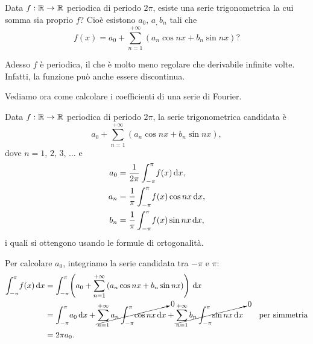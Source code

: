 \documentclass[../../analisi2]{subfiles}
\begin{document}
        Data \(f : \mathbb{R} \to \mathbb{R}\) periodica di periodo \(2\pi\), esiste una serie trigonometrica la cui somma sia proprio \(f\)? Cioè
        esistono \(a_0, \, a_, \, b_n\) tali che
        \[
            f(x) = a_0 + \sum_{n = 1}^{+\infty} \left(a_n \cos nx + b_n \sin nx\right)?
        \]

        \begin{osservazione}
            Adesso \(f\) è periodica, il che è molto meno regolare che derivabile infinite volte. Infatti, la funzione può anche essere
            discontinua.
        \end{osservazione}

        Vediamo ora come calcolare i coefficienti di una serie di Fourier.
        
        \begin{teorema}
            Data \(f : \mathbb{R} \to \mathbb{R}\) periodica di periodo \(2\pi\), la serie trigonometrica candidata è
            \[
                a_0 + \sum_{n = 1}^{+\infty} \left(a_n \cos nx + b_n \sin nx\right),
            \]
            dove \(n = 1, \, 2, \, 3, \, \ldots\) e
            \begin{align*}
                a_0 &= \frac{1}{2\pi} \int_{-\pi}^{\pi} \! f(x) \, \mathrm{d}x,\\
                a_n &= \frac{1}{\pi} \int_{-\pi}^{\pi} \! f(x) \cos nx \, \mathrm{d}x,\\
                b_n &= \frac{1}{\pi} \int_{-\pi}^{\pi} \! f(x) \sin nx \, \mathrm{d}x,
            \end{align*}
            i quali si ottengono usando le formule di ortogonalità.

            Per calcolare \(a_0\), integriamo la serie candidata tra \(-\pi\) e \(\pi\):
            \begin{align*}
                \int_{-\pi}^{\pi} \! f(x) \, \mathrm{d}x &= \int_{-\pi}^{\pi} \! \left(a_0 + \sum_{n = 1}^{+\infty}\left(a_n \cos nx + b_n \sin nx\right)\right) \, \mathrm{d}x\\
                &= \int_{-\pi}^{\pi} \! a_0 \, \mathrm{d}x + \cancelto{0}{\sum_{n = 1}^{+\infty} a_n \int_{-\pi}^{\pi} \! \cos nx \, \mathrm{d}x} + \cancelto{0}{\sum_{n = 1}^{+\infty} b_n \int_{-\pi}^{\pi} \! \sin nx \, \mathrm{d}x} \qquad \text{per simmetria}\\
                &= 2 \pi a_0.
            \end{align*}


\end{teorema}
\end{document}
